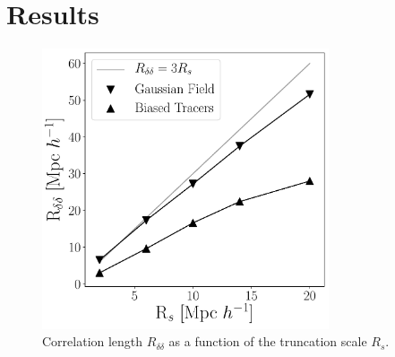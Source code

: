 \documentclass[usenatbib]{mnras}
\begin{document}
\section{Results}






\begin{figure}
    \centering
    \includegraphics[width=240pt]{correlation_length.pdf}
    \caption{Correlation length $R_{\delta\delta}$ as a function of the truncation scale $R_s$.}
    \label{fig:correlation length}
\end{figure}
\end{document}
